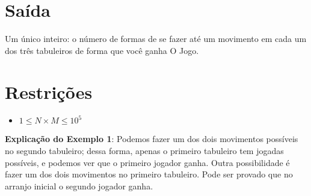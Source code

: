 \section*{Saída}

Um único inteiro: o número de formas de se fazer até um movimento em cada um dos três tabuleiros de forma que você ganha O Jogo.


\section*{Restrições}

\begin{itemize}
\item $1 \leq N\times M \leq 10^5$
\end{itemize}

\exemplo

\bigskip
\textbf{Explicação do Exemplo 1}: Podemos fazer um dos dois movimentos possíveis no segundo tabuleiro; dessa forma, apenas o primeiro tabuleiro tem jogadas possíveis, e podemos ver que o primeiro jogador ganha. Outra possibilidade é fazer um dos dois movimentos no primeiro tabuleiro. Pode ser provado que no arranjo inicial o segundo jogador ganha.

